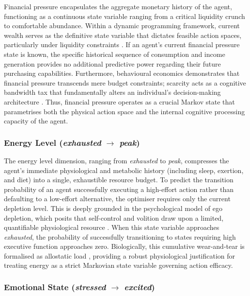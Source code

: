\documentclass[11pt, a4paper]{article}
\begin{document}
Financial pressure encapsulates the aggregate monetary history of the agent, functioning as a
continuous state variable ranging from a critical liquidity crunch to comfortable abundance.
Within a dynamic programming framework, current wealth serves as the definitive state variable
that dictates feasible action spaces, particularly under liquidity constraints
\citep{Deaton1991}. If an agent's current financial pressure state is known, the specific
historical sequence of consumption and income generation provides no additional predictive
power regarding their future purchasing capabilities. Furthermore, behavioural economics
demonstrates that financial pressure transcends mere budget constraints; scarcity acts as a
cognitive bandwidth tax that fundamentally alters an individual's decision-making architecture
\citep{Mullainathan2013}. Thus, financial pressure operates as a crucial Markov state that
parametrises both the physical action space and the internal cognitive processing capacity of
the agent.

\subsubsection{Energy Level (\textit{exhausted} $\rightarrow$ \textit{peak})}

The energy level dimension, ranging from \textit{exhausted} to \textit{peak}, compresses the
agent's immediate physiological and metabolic history (including sleep, exertion, and diet)
into a single, exhaustible resource budget. To predict the transition probability of an agent
successfully executing a high-effort action rather than defaulting to a low-effort alternative,
the optimiser requires only the current depletion level. This is deeply grounded in the
psychological model of ego depletion, which posits that self-control and volition draw upon a
limited, quantifiable physiological resource \citep{Baumeister1998}. When this state variable
approaches \textit{exhausted}, the probability of successfully transitioning to states
requiring high executive function approaches zero. Biologically, this cumulative wear-and-tear
is formalised as allostatic load \citep{McEwen1998}, providing a robust physiological
justification for treating energy as a strict Markovian state variable governing action
efficacy.

\subsubsection{Emotional State (\textit{stressed} $\rightarrow$ \textit{excited})}
\end{document}
